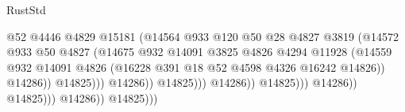 \begin{lexlean}{RustStd}
\begin{coremodule}
                                                    @52
                                                    @4446
                                                    @4829
                                                    @15181
                                                    (@14564
                                                      @933
                                                      @120
                                                      @50
                                                      @28
                                                      @4827
                                                      @3819
                                                      (@14572
                                                        @933
                                                        @50
                                                        @4827
                                                        (@14675
                                                          @932
                                                          @14091
                                                          @3825
                                                          @4826
                                                          @4294
                                                          @11928
                                                          (@14559
                                                            @932
                                                            @14091
                                                            @4826
                                                            (@16228
                                                              @391
                                                              @18
                                                              @52
                                                              @4598
                                                              @4326
                                                              @16242
                                                              @14826))
                                                          @14286))
                                                      @14825)))
                                                @14286))
                                            @14825)))
                                      @14286))
                                  @14825)))
                            @14286))
                        @14825)))
                  @14286))
              @14825)))

\end{coremodule}
\end{lexlean}
